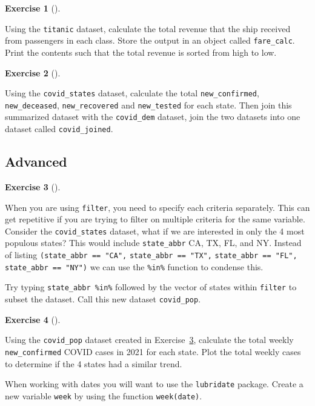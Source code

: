 \documentclass[
  letterpaper,
  DIV=11,
  numbers=noendperiod]{scrreprt}
\theoremstyle{definition}
\newtheorem{exercise}{Exercise}[chapter]
\theoremstyle{remark}
\begin{document}
\begin{exercise}[]\protect\hypertarget{exr-ch03-app3}{}\label{exr-ch03-app3}

Using the \texttt{titanic} dataset, calculate the total revenue that the
ship received from passengers in each class. Store the output in an
object called \texttt{fare\_calc}. Print the contents such that the
total revenue is sorted from high to low.

\end{exercise}

\begin{exercise}[]\protect\hypertarget{exr-ch03-app4}{}\label{exr-ch03-app4}

Using the \texttt{covid\_states} dataset, calculate the total
\texttt{new\_confirmed}, \texttt{new\_deceased}, \texttt{new\_recovered}
and \texttt{new\_tested} for each state. Then join this summarized
dataset with the \texttt{covid\_dem} dataset, join the two datasets into
one dataset called \texttt{covid\_joined}.

\end{exercise}

\hypertarget{sec-ex03-advanced}{%
\subsection{Advanced}\label{sec-ex03-advanced}}

\begin{exercise}[]\protect\hypertarget{exr-ch03-adv1}{}\label{exr-ch03-adv1}

When you are using \texttt{filter}, you need to specify each criteria
separately. This can get repetitive if you are trying to filter on
multiple criteria for the same variable. Consider the
\texttt{covid\_states} dataset, what if we are interested in only the 4
most populous states? This would include \texttt{state\_abbr} CA, TX,
FL, and NY. Instead of listing \texttt{(state\_abbr\ ==\ "CA",}
\texttt{state\_abbr\ ==\ "TX",} \texttt{state\_abbr\ ==\ "FL",}
\texttt{state\_abbr\ ==\ "NY")} we can use the \texttt{\%in\%} function
to condense this.

Try typing \texttt{state\_abbr\ \%in\%} followed by the vector of states
within \texttt{filter} to subset the dataset. Call this new dataset
\texttt{covid\_pop}.

\end{exercise}

\begin{exercise}[]\protect\hypertarget{exr-ch03-adv2}{}\label{exr-ch03-adv2}

Using the \texttt{covid\_pop} dataset created in
Exercise~\ref{exr-ch03-adv1}, calculate the total weekly
\texttt{new\_confirmed} COVID cases in 2021 for each state. Plot the
total weekly cases to determine if the 4 states had a similar trend.

When working with dates you will want to use the \texttt{lubridate}
package. Create a new variable \texttt{week} by using the function
\texttt{week(date)}.

\end{exercise}
\end{document}
